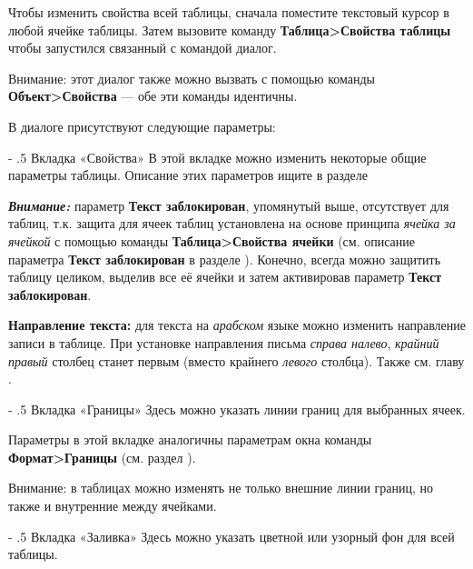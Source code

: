 ﻿\documentclass[a4paper,10pt]{article}
\makeatletter
\renewcommand\paragraph{%
   \@startsection{paragraph}{4}{0mm}%
      {-\baselineskip}%
      {.5\baselineskip}%
      {\normalfont\normalsize\bfseries}}
\makeatother
\begin{document}
Чтобы изменить свойства всей таблицы, сначала поместите текстовый курсор в любой ячейке таблицы. Затем вызовите команду \textbf{Таблица>Свойства таблицы} чтобы запустился связанный с командой диалог.

Внимание: этот диалог также можно вызвать с помощью команды \textbf{Объект>Свойства} — обе эти команды идентичны.

В диалоге присутствуют следующие параметры:

\paragraph{Вкладка «Свойства»}
В этой вкладке можно изменить некоторые общие параметры таблицы. Описание этих параметров ищите в разделе 

\textit{\textbf{Внимание:}} параметр \textbf{Текст заблокирован}, упомянутый выше, отсутствует для таблиц, т.к. защита для ячеек таблиц установлена на основе принципа \textit{ячейка за ячейкой} с помощью команды \textbf{Таблица>Свойства ячейки} (см. описание параметра \textbf{Текст заблокирован} в разделе ). Конечно, всегда можно защитить таблицу целиком, выделив все её ячейки и затем активировав параметр \textbf{Текст заблокирован}.

\textbf{Направление текста:} для текста на \textit{арабском} языке можно изменить направление записи в таблице. При установке направления письма \textit{справа налево}, \textit{крайний правый} столбец станет первым (вместо крайнего \textit{левого} столбца). Также см. главу .

\paragraph{Вкладка «Границы»}
Здесь можно указать линии границ для выбранных ячеек.

Параметры в этой вкладке аналогичны параметрам окна команды \textbf{Формат>Границы} (см. раздел ).

Внимание: в таблицах можно изменять не только внешние линии границ, но также и внутренние между ячейками.

\paragraph{Вкладка «Заливка»}
Здесь можно указать цветной или узорный фон для всей таблицы.
\end{document}
